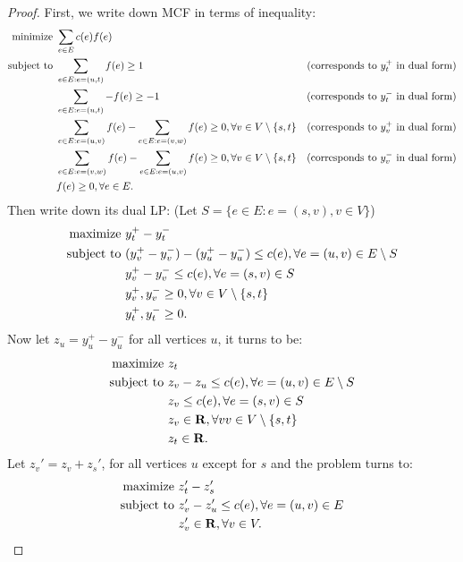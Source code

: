     \begin{proof}
        First, we write down MCF in terms of inequality: 
        \begin{align*}
        {\rm minimize}\ &\sum_{e\in E}c(e)f(e)\\
        {\rm subject\ to}\ &\sum_{e\in E:e=(u,t)}f(e)\geq 1 & \text{(corresponds to $y_t^+$ in dual form)}\\
        &\sum_{e\in E:e=(u,t)}-f(e)\geq -1 & \text{(corresponds to $y_t^-$ in dual form)}\\
        &\sum_{e\in E:e=(u,v)}f(e)-\sum_{e\in E:e=(v,w)}f(e)\geq 0,\forall v\in V\setminus\{s,t\} & \text{(corresponds to $y_v^+$ in dual form)}\\
        &\sum_{e\in E:e=(v,w)}f(e)-\sum_{e\in E:e=(u,v)}f(e)\geq 0,\forall v\in V\setminus\{s,t\} & \text{(corresponds to $y_v^-$ in dual form)}\\
        &f(e) \geq 0, \forall e \in E.
        \end{align*}
        Then write down its dual LP: (Let $S=\{e\in E:e=(s,v),v\in V\}$)
        \begin{align*}
        {\rm maximize}\ &y_t^+-y_t^-\\
        {\rm subject\ to}\ &(y_v^+-y_v^-)-(y_u^+-y_u^-)\leq c(e),\forall e=(u,v)\in E\setminus S\\
        &y_v^+-y_v^-\leq c(e),\forall e=(s,v)\in S \\
        & y_v^+, y_v^- \geq 0, \forall v\in V\setminus\{s,t\} \\
        & y_t^+, y_t^- \geq 0.
        \end{align*}
        Now let $z_u=y_u^+-y_u^-$ for all vertices $u$, it turns to be: 
        \begin{align*}
        {\rm maximize}\ &z_t\\
        {\rm subject\ to}\ &z_v-z_u\leq c(e),\forall e=(u,v)\in E\setminus S\\
        &z_v\leq c(e),\forall e=(s,v)\in S \\
        & z_v \in \mathbf{R}, \forall v v\in V\setminus\{s,t\} \\
        & z_t \in \mathbf{R}.
        \end{align*}
        Let $z_v'=z_v+z_s'$, for all vertices $u$ except for $s$ and the problem turns to: 
        \begin{align*}
        {\rm maximize}\ &z_t'-z_s'\\
        {\rm subject\ to}\ &z_v'-z_u'\leq c(e),\forall e=(u,v)\in E \\
        & z_v' \in \mathbf{R}, \forall v \in V.
        \end{align*}
    \end{proof}
    
